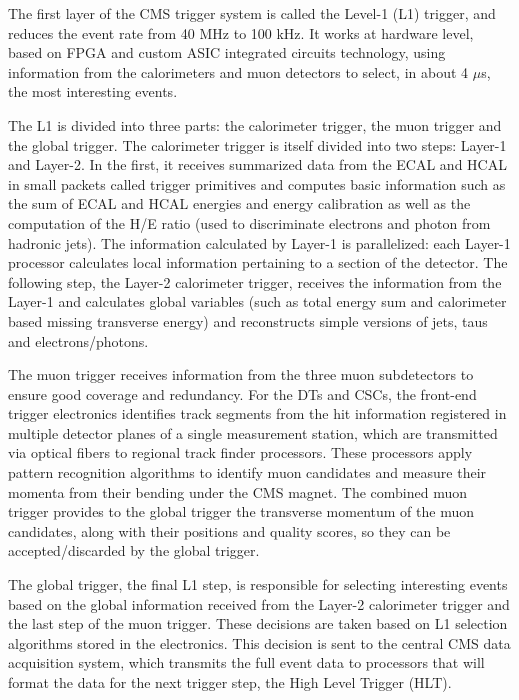 The first layer of the CMS trigger system is called the Level-1 (L1) trigger, and reduces the event rate from 40 MHz to 100 kHz. 
It works at hardware level, based on FPGA and custom ASIC integrated circuits technology, using information from the calorimeters and muon detectors to select, in about 4 $\mu$s, the most interesting events. 

The L1 is divided into three parts: the calorimeter trigger, the muon trigger and the global trigger.
The calorimeter trigger is itself divided into two steps: Layer-1 and Layer-2. 
In the first, it receives summarized data from the ECAL and HCAL in small packets called trigger primitives and computes basic information such as the sum of ECAL and HCAL energies and energy calibration as well as the computation of the H/E ratio (used to discriminate electrons and photon from hadronic jets). 
The information calculated by Layer-1 is parallelized: each Layer-1 processor calculates local information pertaining to a section of the detector. 
The following step, the Layer-2 calorimeter trigger, receives the information from the Layer-1 and calculates global variables (such as total energy sum and calorimeter based missing transverse energy) and reconstructs simple versions of jets, taus and electrons/photons. 

The muon trigger receives information from the three muon subdetectors to ensure good coverage and redundancy. 
For the DTs and CSCs, the front-end trigger electronics identifies track segments from the hit information registered in multiple detector planes of a single measurement station, which are transmitted via optical fibers to regional track finder processors. 
These processors apply pattern recognition algorithms to identify muon candidates and measure their momenta from their bending under the CMS magnet. 
The combined muon trigger provides to the global trigger the transverse momentum of the muon candidates, along with their positions and quality scores, so they can be accepted/discarded by the global trigger. 

The global trigger, the final L1 step, is responsible for selecting interesting events based on the global information received from the Layer-2 calorimeter trigger and the last step of the muon trigger. 
These decisions are taken based on L1 selection algorithms stored in the electronics. 
This decision is sent to the central CMS data acquisition system, which transmits the full event data to processors that will format the data for the next trigger step, the High Level Trigger (HLT). 


